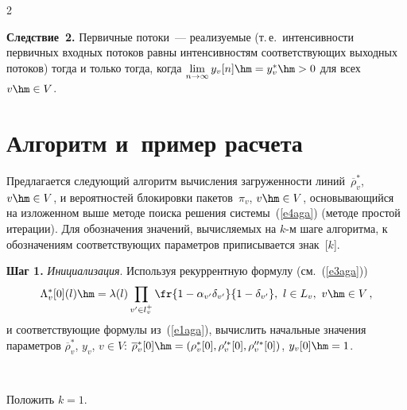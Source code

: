 \begin{multicols}{2}
     \smallskip
     
     \noindent
     \textbf{Следствие~2.} Первичные потоки~--- реали\-зу\-емые (т.\,е.\ 
интенсивности первичных входных потоков равны интенсивностям 
соответствующих выходных потоков) тогда и только тогда, когда 
$\lim\limits_{n\rightarrow\infty} y_v[n]\hm=y_v^*\hm>0$ для всех $v\hm\in V$. 
     
\section{Алгоритм и~пример расчета}
     
     Предлагается следующий алгоритм вычисления загруженности 
линий~$\overline{\rho}_v^*$, $v\hm\in V$, и вероятностей блокировки 
пакетов~$\pi_v$, $v\hm\in V$, основывающийся на изложенном выше методе 
поиска решения системы~(\ref{e4aga}) (методе простой итерации). Для 
обозначения значений, вычисляемых на $k$-м шаге алгоритма, к 
обозначениям соответствующих параметров приписывается знак~[$k$]. 
     
     \textbf{Шаг 1.} \textit{Инициализация}. Используя рекуррентную 
формулу (см.~(\ref{e3aga})) 
$$
\Lambda^*_v[0](l)\hm=\lambda(l)\prod\limits_{v^\prime\in l_v^+} \fr{1-
\alpha_{ v^\prime }\delta_{ v^\prime }}{1-\delta_{v^\prime}},\ l\in L_v, \
v\hm\in V\,,
$$
и соответствующие формулы из~(\ref{e1aga}), вычислить 
начальные значения параметров $\overline{\rho}_v^*$, $y_v$, $v\in V$: 
$\overline{\rho}_v^*[0]\hm= \left(\rho_v^* [0], \rho_v^{\prime *}[0], 
\rho_v^{\prime\prime *}[0]\right)$, $y_v[0]\hm=1$.

\begin{figure} %
\vspace*{1pt}
 \begin{center}
 \mbox{%
 \epsfxsize=148.986mm
 }
 \end{center}
 \vspace*{-9pt}
\vspace*{12pt}
\end{figure}
     
     Положить $k=1$.
     
     \pagebreak
     


\end{multicols}

